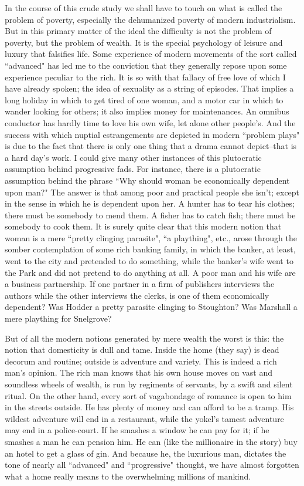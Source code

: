 \documentclass[final,10pt,letterpaper,twocolumn,openany]{book}
\begin{document}
    In the course of this crude study we shall have to touch on what is
called the problem of poverty, especially the dehumanized poverty of
modern industrialism. But in this primary matter of the ideal the difficulty
is not the problem of poverty, but the problem of wealth. It is the special
psychology of leisure and luxury that falsifies life. Some experience of
modern movements of the sort called ``advanced" has led me to the
conviction that they generally repose upon some experience peculiar to the
rich. It is so with that fallacy of free love of which I have already spoken;
the idea of sexuality as a string of episodes. That implies a long holiday in
which to get tired of one woman, and a motor car in which to wander
looking for others; it also implies money for maintenances. An omnibus
conductor has hardly time to love his own wife, let alone other people's.
And the success with which nuptial estrangements are depicted in modern
``problem plays" is due to the fact that there is only one thing that a drama
cannot depict--that is a hard day's work. I could give many other instances
of this plutocratic assumption behind progressive fads. For instance, there
is a plutocratic assumption behind the phrase ``Why should woman be
economically dependent upon man?" The answer is that among poor and
practical people she isn't; except in the sense in which he is dependent
upon her. A hunter has to tear his clothes; there must be somebody to
mend them. A fisher has to catch fish; there must be somebody to cook
them. It is surely quite clear that this modern notion that woman is a mere
``pretty clinging parasite", ``a plaything", etc., arose through the somber
contemplation of some rich banking family, in which the banker, at least,
went to the city and pretended to do something, while the banker's wife
went to the Park and did not pretend to do anything at all. A poor man and
his wife are a business partnership. If one partner in a firm of publishers
interviews the authors while the other interviews the clerks, is one of them
economically dependent? Was Hodder a pretty parasite clinging to
Stoughton? Was Marshall a mere plaything for Snelgrove?

But of all the modern notions generated by mere wealth the worst is
this: the notion that domesticity is dull and tame. Inside the home (they
say) is dead decorum and routine; outside is adventure and variety. This is
indeed a rich man's opinion. The rich man knows that his own house
moves on vast and soundless wheels of wealth, is run by regiments of
servants, by a swift and silent ritual. On the other hand, every sort of
vagabondage of romance is open to him in the streets outside. He has
plenty of money and can afford to be a tramp. His wildest adventure will
end in a restaurant, while the yokel's tamest adventure may end in a
police-court. If he smashes a window he can pay for it; if he smashes a
man he can pension him. He can (like the millionaire in the story) buy an
hotel to get a glass of gin. And because he, the luxurious man, dictates the
	tone of nearly all ``advanced" and ``progressive" thought, we have almost
forgotten what a home really means to the overwhelming millions of
mankind.
\end{document}
